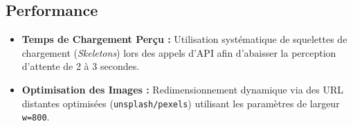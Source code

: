 \documentclass[11pt,a4paper]{article}
\begin{document}
\subsection{Performance}
\begin{itemize}
    \item \textbf{Temps de Chargement Perçu :} Utilisation systématique de squelettes de chargement (\textit{Skeletons}) lors des appels d'API afin d'abaisser la perception d'attente de 2 à 3 secondes.
    \item \textbf{Optimisation des Images :} Redimensionnement dynamique via des URL distantes optimisées (\texttt{unsplash/pexels}) utilisant les paramètres de largeur \texttt{w=800}.
\end{itemize}
\end{document}
